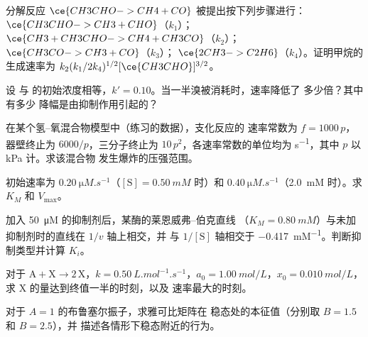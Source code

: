 \begin{exercise}[$\star\star$]\label{exo:b3:complex-kinetics:5}
分解反应 $\ce{CH3CHO -> CH4 + CO}$ 被提出按下列步骤进行：$\ce{CH3CHO -> CH3 +
CHO}$（$k_1$）；$\ce{CH3 + CH3CHO -> CH4 + CH3CO}$（$k_2$）；$\ce{CH3CO -> CH3 + CO}$（$k_3$）；
$\ce{2 CH3 -> C2H6}$（$k_4$）。证明甲烷的生成速率为
$k_2(k_1/2k_4)^{1/2}[\ce{CH3CHO}]^{3/2}$。
\end{exercise}

\begin{exercise}[$\star\star$]\label{exo:b3:complex-kinetics:6}
设  与  的初始浓度相等，$k' = 0.10$。当一半溴被消耗时，速率降低了
多少倍？其中有多少
降幅是由抑制作用引起的？
\end{exercise}

\begin{exercise}[$\star\star$]\label{exo:b3:complex-kinetics:7}
在某个氢–氧混合物模型中（练习的数据），支化反应的
速率常数为 $f = 1000\,p$，器壁终止为 $6000/p$，三分子终止为
$10\,p^2$，各速率常数的单位均为 \unit{s^{-1}}，其中 $p$ 以 kPa 计。求该混合物
发生爆炸的压强范围。
\end{exercise}

\begin{exercise}[$\star\star$]\label{exo:b3:complex-kinetics:8}
初始速率为 $\qty{0.20}{\micro M.s^{-1}}$（$[\mathrm S] = \qty{0.50}{mM}$ 时）和
$\qty{0.40}{\micro M.s^{-1}}$（\qty{2.0}{mM} 时）。求 $K_M$ 和 $V_{\max}$。
\end{exercise}

\begin{exercise}[$\star\star$]\label{exo:b3:complex-kinetics:9}
加入 \qty{50}{\micro M} 的抑制剂后，某酶的莱恩威弗–伯克直线
（$K_M = \qty{0.80}{mM}$）与未加抑制剂时的直线在 $1/v$ 轴上相交，并
与 $1/[\mathrm S]$ 轴相交于 \qty{-0.417}{mM^{-1}}。判断抑制类型并计算 $K_i$。
\end{exercise}

\begin{exercise}[$\star\star\star$]\label{exo:b3:complex-kinetics:10}
对于 $\mathrm{A + X \to 2\,X}$，$k = \qty{0.50}{L.mol^{-1}.s^{-1}}$，$a_0 = \qty{1.00}{mol/L}$，$x_0 = \qty{0.010}{mol/L}$，
求 X 的量达到终值一半的时刻，以及
速率最大的时刻。
\end{exercise}

\begin{exercise}[$\star\star\star$]\label{exo:b3:complex-kinetics:11}
对于 $A = 1$ 的布鲁塞尔振子，求雅可比矩阵在
稳态处的本征值（分别取 $B = 1.5$ 和 $B = 2.5$），并
描述各情形下稳态附近的行为。
\end{exercise}

